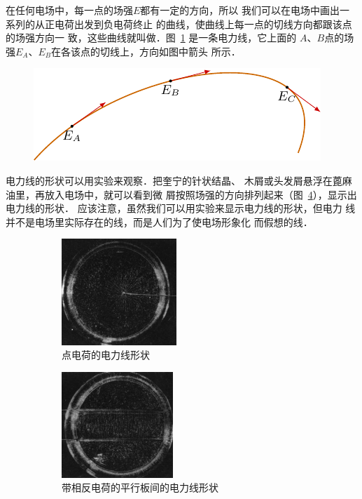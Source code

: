 在任何电场中，每一点的场强$E$都有一定的方向，所以
我们可以在电场中画出一系列的从正电荷出发到负电荷终止
的曲线，使曲线上每一点的切线方向都跟该点的场强方向一
致，这些曲线就叫做．图~\ref{fig_B_6-7} 是一条电力线，它上面的
$A$、$B$点的场强$E_A$、$E_B$在各该点的切线上，方向如图中箭头
所示．
\begin{figure}[htbp]
    \centering
    \includegraphics{fig/B/6-7.pdf}
    \caption{}\label{fig_B_6-7}
\end{figure}

电力线的形状可以用实验来观察．把奎宁的针状结晶、
木屑或头发屑悬浮在蓖麻油里，再放入电场中，就可以看到微
屑按照场强的方向排列起来（图~\ref{fig_B_6-8}），显示出电力线的形状．
应该注意，虽然我们可以用实验来显示电力线的形状，但电力
线并不是电场里实际存在的线，而是人们为了使电场形象化
而假想的线．
\begin{figure}[htbp]\centering
    \begin{subfigure}{0.4\linewidth}
        \centering
        \includegraphics[height=4cm]{fig/B/6-8a.jpg}
        \caption{点电荷的电力线形状}\label{fig_B_6-8a}
    \end{subfigure}
    \hfil
    \begin{subfigure}{0.4\linewidth}
        \centering
        \includegraphics[height=4cm]{fig/B/6-8b.jpg}
        \caption{带相反电荷的平行板间的电力线形状}\label{fig_B_6-8b}
    \end{subfigure}
    \caption{}\label{fig_B_6-8}
\end{figure}

